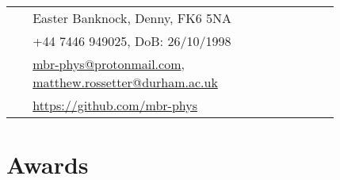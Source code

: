 \documentclass[10pt]{article} %
\begin{document}
\begin{paracol}{2}

\switchcolumn %


\parbox[top][0.12\textheight][c]{\linewidth}{ %
	\vspace{-0.04\textheight} %
	\colorbox{shade}{ %
		\begin{supertabular}{p{0.05\linewidth}|p{0.775\linewidth}} %
			\raisebox{-1pt}{\faHome} & Easter Banknock, Denny, FK6 5NA \\ %
			\raisebox{-1pt}{\faPhone} & +44 7446 949025, DoB: 26/10/1998 \\ %
            \raisebox{0pt}{\small\faEnvelope} & \href{mailto:mbr-phys@protonmail.com}{mbr-phys@protonmail.com}, \href{mailto:matthew.rossetter@durham.ac.uk}{matthew.rossetter@durham.ac.uk} \\ %
			\raisebox{-1pt}{\faGithub} & \href{https://github.com/mbr-phys}{https://github.com/mbr-phys} \\ %
		\end{supertabular}
	}
}


\section{Awards}


\end{paracol}
\end{document}
